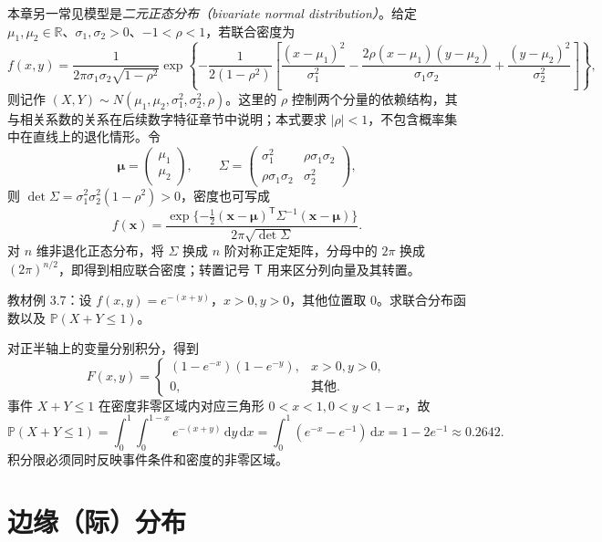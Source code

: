 本章另一常见模型是\emph{二元正态分布（bivariate normal distribution）}。给定 $\mu_1,\mu_2\in\mathbb R$、$\sigma_1,\sigma_2>0$、$-1<\rho<1$，若联合密度为
\begin{equation}
  f(x,y)=\frac1{2\pi\sigma_1\sigma_2\sqrt{1-\rho^2}}
  \exp\!\left\{-\frac1{2(1-\rho^2)}
    \left[\frac{(x-\mu_1)^2}{\sigma_1^2}
    -\frac{2\rho(x-\mu_1)(y-\mu_2)}{\sigma_1\sigma_2}
    +\frac{(y-\mu_2)^2}{\sigma_2^2}\right]\right\},
  \label{eq:study-ch3-bivariate-normal-density}
\end{equation}
则记作 $(X,Y)\sim N(\mu_1,\mu_2,\sigma_1^2,\sigma_2^2,\rho)$。这里的 $\rho$ 控制两个分量的依赖结构，其与相关系数的关系在后续数字特征章节中说明；本式要求 $|\rho|<1$，不包含概率集中在直线上的退化情形。令
\[
  \boldsymbol\mu=\begin{pmatrix}\mu_1\\\mu_2\end{pmatrix},\qquad
  \Sigma=\begin{pmatrix}\sigma_1^2&\rho\sigma_1\sigma_2\\
    \rho\sigma_1\sigma_2&\sigma_2^2\end{pmatrix},
\]
则 $\det\Sigma=\sigma_1^2\sigma_2^2(1-\rho^2)>0$，密度也可写成
\[
  f(\boldsymbol x)=\frac{\exp\{-\tfrac12(\boldsymbol x-\boldsymbol\mu)^{\mathsf T}
    \Sigma^{-1}(\boldsymbol x-\boldsymbol\mu)\}}
    {2\pi\sqrt{\det\Sigma}}.
\]
对 $n$ 维非退化正态分布，将 $\Sigma$ 换成 $n$ 阶对称正定矩阵，分母中的 $2\pi$ 换成 $(2\pi)^{n/2}$，即得到相应联合密度；转置记号 $\mathsf T$ 用来区分列向量及其转置。

\begin{example}
\label{ex:study-ch3-joint-exponential-region}
教材例 3.7：设 $f(x,y)=e^{-(x+y)}$，$x>0,y>0$，其他位置取 $0$。求联合分布函数以及 $\mathbb P(X+Y\le1)$。
\end{example}

\begin{solve}
对正半轴上的变量分别积分，得到
\[
  F(x,y)=
  \begin{cases}
    (1-e^{-x})(1-e^{-y}),&x>0,y>0,\\
    0,&\text{其他}.
  \end{cases}
\]
事件 $X+Y\le1$ 在密度非零区域内对应三角形 $0<x<1,0<y<1-x$，故
\[
  \mathbb P(X+Y\le1)
  =\int_0^1\int_0^{1-x}e^{-(x+y)}\,\mathrm dy\,\mathrm dx
  =\int_0^1(e^{-x}-e^{-1})\,\mathrm dx
  =1-2e^{-1}\approx0.2642.
\]
积分限必须同时反映事件条件和密度的非零区域。
\end{solve}

\section{边缘（际）分布}
\label{sec:study-marginal-distributions}

